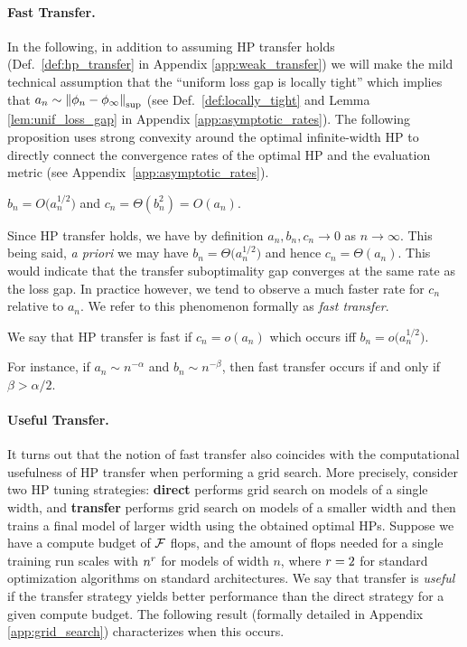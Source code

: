 \paragraph{Fast Transfer.} In the following, in addition to assuming HP transfer holds (Def.\ \ref{def:hp_transfer} in Appendix \ref{app:weak_transfer}) we will make the mild technical assumption that the ``uniform loss gap is locally tight'' which implies that $a_n \sim \norm{\phi_n - \phi_\infty}_{\mathrm{sup}}$ (see Def.\ \ref{def:locally_tight} and Lemma \ref{lem:unif_loss_gap} in Appendix \ref{app:asymptotic_rates}). The following proposition uses strong convexity around the optimal infinite-width HP to directly connect the convergence rates of the optimal HP and the evaluation metric (see Appendix~\ref{app:asymptotic_rates}).
\begin{proposition}\label{prop:basic_rate}
     $b_n = O\big(a_n^{1 / 2}\big)$ and $c_n = \Theta(b_n^2) = O(a_n)$.
\end{proposition}
Since HP transfer holds, we have by definition $a_n, b_n, c_n \to 0$ as $n \to \infty$. This being said, \textit{a priori} we may have $b_n = \Theta\big(a_n^{1/2}\big)$ and hence $c_n = \Theta(a_n)$. This would indicate that the transfer suboptimality gap converges at the same rate as the loss gap. In practice however, we tend to observe a much faster rate for $c_n$ relative to $a_n$. We refer to this phenomenon formally as \textit{fast transfer}.
\begin{definition}
We say that HP transfer is fast if $c_n = o(a_n)$ which occurs iff $b_n = o\big(a_n^{1/2}\big)$.
    \label{def:fast-transfer}
\end{definition}
For instance, if $a_n \sim n^{-\alpha}$ and $b_n \sim n^{-\beta}$, then fast transfer occurs if and only if $ \beta > \alpha / 2$. 

\paragraph{Useful Transfer.} It turns out that the notion of fast transfer also coincides with the computational usefulness of HP transfer when performing a grid search. More precisely, consider two HP tuning strategies: \textbf{direct} performs grid search on models of a single width, and \textbf{transfer} performs grid search on models of a smaller width and then trains a final model of larger width using the obtained optimal HPs.  
Suppose we have a compute budget of $\mathcal{F}$ flops, and the amount of flops needed for a single training run scales with $n^{r}$ for models of width $n$, where $r = 2$ for standard optimization algorithms on standard architectures. 
We say that transfer is \textit{useful} if the transfer strategy yields better performance than the direct strategy for a given compute budget. The following result (formally detailed in Appendix \ref{app:grid_search}) characterizes when this occurs. 


